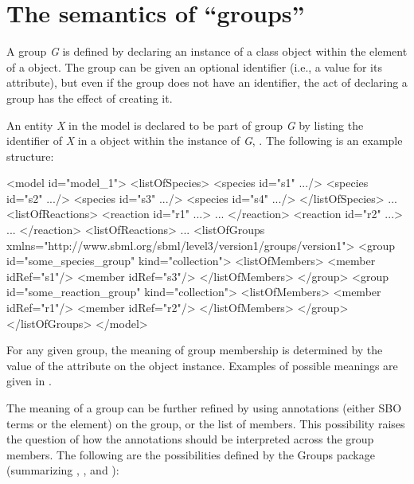 \section{The semantics of ``groups''}
\label{semantics}

A group \emph{G} is defined by declaring an instance of a \Group class object within the \ListOfGroups element of a \Model object. The group can be given an optional identifier (i.e., a value for its  attribute), but even if the group does not have an identifier, the act of declaring a group has the effect of creating it.

An entity \emph{X} in the model is declared to be part of group \emph{G} by listing the identifier of \emph{X} in a \Member object within the \ListOfGroups instance of \emph{G}, . The following is an example  structure:

\begin{example}
<model id="model_1"> 
  <listOfSpecies> 
    <species id="s1" .../> 
    <species id="s2" .../> 
    <species id="s3" .../> 
    <species id="s4" .../> 
  </listOfSpecies> 
  ... 
  <listOfReactions> 
    <reaction id="r1" ...> ... </reaction> 
    <reaction id="r2" ...> ... </reaction> 
  <listOfReactions> 
  ... 
  <listOfGroups xmlns="http://www.sbml.org/sbml/level3/version1/groups/version1"> 
    <group id="some_species_group" kind="collection"> 
      <listOfMembers> 
        <member idRef="s1"/> 
        <member idRef="s3"/> 
      </listOfMembers> 
    </group> 
    <group id="some_reaction_group" kind="collection"> 
      <listOfMembers> 
        <member idRef="r1"/> 
        <member idRef="r2"/> 
      </listOfMembers> 
    </group> 
  </listOfGroups> 
</model>
\end{example}

For any given group, the meaning of group membership is determined by the value of the attribute  on the \Group object instance.  Examples of possible meanings are given in .

The meaning of a group can be further refined by using annotations (either SBO terms or the \Annotation element) on the group, or the list of members. This possibility raises the question of how the annotations should be interpreted across the group members.  The following are the possibilities defined by the Groups package (summarizing , , and ):

